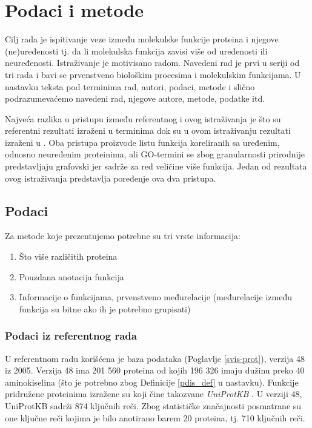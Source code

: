 
\chapter{Podaci i metode} %

\label{Podaci i metode} %

Cilj rada je ispitivanje veze između molekulske funkcije proteina i njegove\\ 
(ne)uređenosti tj. da li molekulska funkcija zavisi više od uređenosti ili
neuređenosti. Istraživanje je motivisano radom\parencite{Xie2007}. Navedeni rad
je prvi u seriji od tri rada i bavi se prvenstveno biološkim procesima i
molekulskim funkcijama.  U nastavku teksta pod terminima 
rad, autori, podaci, metode i slično podrazumevaćemo navedeni rad, njegove
autore, metode, podatke itd.

Najveća razlika u pristupu između referentnog i ovog istraživanja je što su
referentni rezultati izraženi u terminima  dok su u ovom
istraživanju rezultati izraženi u . Oba pristupa
proizvode listu funkcija koreliranih sa uređenim, odnosno neuređenim
proteinima, ali GO-termini se zbog granularnosti prirodnije predstavljaju
grafovski jer sadrže za red veličine više funkcija. Jedan od rezultata ovog
istraživanja predstavlja poređenje ova dva pristupa.


\section {Podaci}

Za metode koje prezentujemo potrebne su tri vrste informacija:
\begin{enumerate}
  \item Što više različitih proteina
  \item Pouzdana anotacija funkcija
  \item Informacije o funkcijama, prvenstveno međurelacije (međurelacije između\\ funkcija su bitne  ako ih je potrebno grupisati)
\end{enumerate}


\subsection{Podaci iz referentnog rada}

U referentnom radu \parencite{Xie2007} korišćena je  baza podataka 
\keyword{\swissprot} (Poglavlje \ref{svis-prot}), verzija 48 iz 2005.
Verzija 48 ima 201 560 proteina od kojih 196 326 imaju dužinu preko 40
aminokiselina (što je potrebno zbog Definicije \ref{pdis_def} u nastavku). Funkcije
pridružene proteinima izražene su 
 koji čine takozvane \textit{UniProtKB} 
. U verziji 48, UniProtKB sadrži 874 ključnih reči.  Zbog
statističke značajnosti posmatrane su one ključne reči kojima je bilo anotirano
barem 20 proteina, tj. 710 ključnih reči.

